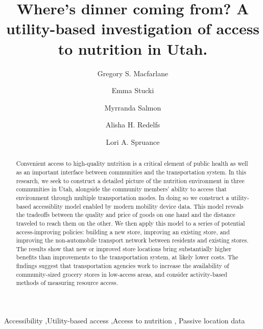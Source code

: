 \documentclass[
  letterpaper,
  number,
  review,
  doubleblind,
  3p]{elsarticle}
\begin{document}
\begin{frontmatter}
\title{Where's dinner coming from? A utility-based investigation of
access to nutrition in Utah.}
\author[1]{Gregory S. Macfarlane%
%
}
\author[1]{Emma Stucki%
%
}

\author[1]{Myrranda Salmon%
%
}

\author[2]{Alisha H. Redelfs%
%
}

\author[2]{Lori A. Spruance%
%
}








        
\begin{abstract}
Convenient access to high-quality nutrition is a critical element of
public health as well as an important interface between communities and
the transportation system. In this research, we seek to construct a
detailed picture of the nutrition environment in three communities in
Utah, alongside the community members' ability to access that
environment through multiple transportation modes. In doing so we
construct a utility-based accessiblity model enabled by modern mobility
device data. This model reveals the tradeoffs between the quality and
price of goods on one hand and the distance traveled to reach them on
the other. We then apply this model to a series of potential
access-improving policies: building a new store, improving an existing
store, and improving the non-automobile transport network between
residents and existing stores. The results show that new or improved
store locations bring substantially higher benefits than improvements to
the transportation system, at likely lower costs. The findings suggest
that transportation agencies work to increase the availability of
community-sized grocery stores in low-access areas, and consider
activity-based methods of measuring resource access.
\end{abstract}





\begin{keyword}
    Accessibility \sep Utility-based access \sep Access to
nutrition \sep 
    Passive location data
\end{keyword}
\end{frontmatter}
    
\end{document}
